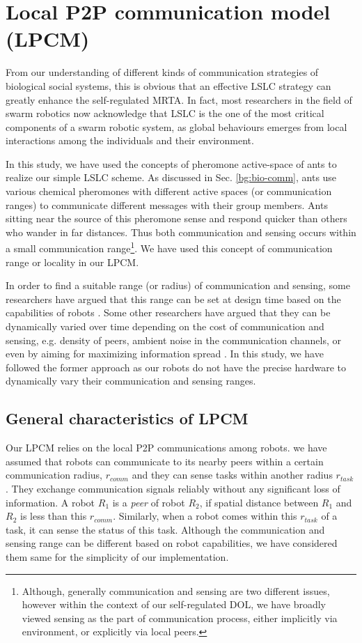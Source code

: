 \documentclass[final,5p,times,twocolumn]{elsarticle}
\begin{document}
\section{Local P2P communication model (LPCM)}
From our understanding of different kinds of communication strategies of biological social systems, this is obvious that an effective LSLC strategy can greatly enhance the self-regulated MRTA.  In fact, most  researchers in the field of swarm robotics now acknowledge that LSLC is the one of the most critical components of a swarm robotic system, as global behaviours emerges from local interactions among the individuals and their environment.

In this study, we have used the concepts of pheromone active-space of ants to realize our simple LSLC scheme. As discussed in Sec. \ref{bg:bio-comm}, ants use various chemical pheromones with different active spaces (or communication ranges) to communicate different messages with their group members. Ants sitting near the source of this pheromone sense and respond quicker than others who wander in far distances. Thus both communication and sensing occurs within a small communication range\footnote{Although, generally communication and sensing are two different issues, however within the context of our self-regulated DOL, we have broadly viewed sensing as the part of communication process, either implicitly via environment, or explicitly via local peers.}. We have used this concept of communication range or locality in our LPCM.

In order to find a suitable  range (or radius) of communication and sensing, some researchers have argued that this range can be set at design time based on the capabilities of robots \cite{Agassounon+2002}. Some other researchers have argued that they can be dynamically varied over time depending on the  cost of communication and sensing, e.g. density of peers, ambient noise in the communication channels, or even by aiming for maximizing information spread  \cite{Yoshida+2000}. In this study, we have followed the former approach as our robots do not have the precise hardware to dynamically vary their communication and sensing ranges.
\subsection{General characteristics of LPCM}
Our LPCM relies on the local P2P communications among robots. we have assumed that robots can communicate to its nearby peers within a certain communication radius, $r_{comm}$ and they can sense tasks within another radius $r_{task}$. They exchange communication signals reliably without any significant loss of information. A robot $R_1$ is a {\em peer} of robot $R_2$, if spatial distance between $R_1$ and $R_2$ is less than this $r_{comm}$.
Similarly, when a robot comes within this $r_{task}$ of a task, it can sense the status of this task. Although the communication and sensing  range can be different based on robot capabilities, we have considered them same for the simplicity of our implementation.
\end{document}
